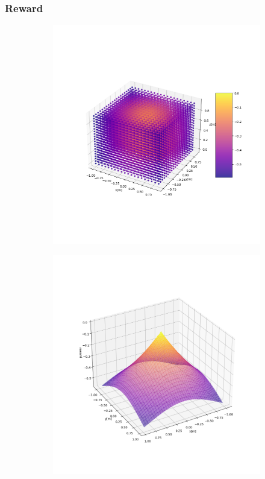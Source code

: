 \subsubsection{Reward}
\begin{figure}
	\centering
	\begin{subfigure}{0.3\linewidth}
		\includegraphics[width=\linewidth]{figures/rew3d.png}
		\caption{}
	\end{subfigure}
	\begin{subfigure}{0.3\linewidth}
		\includegraphics[width=\linewidth]{figures/rewXY.png}

\end{subfigure}
\end{figure}
